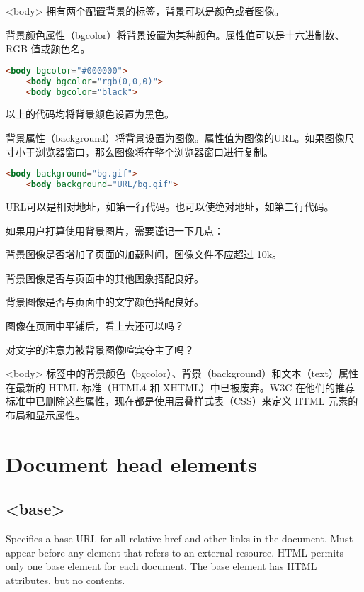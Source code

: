 <body> 拥有两个配置背景的标签，背景可以是颜色或者图像。

背景颜色属性（bgcolor）将背景设置为某种颜色。属性值可以是十六进制数、RGB 值或颜色名。

\begin{lstlisting}[language=HTML]
	<body bgcolor="#000000">
	<body bgcolor="rgb(0,0,0)">
	<body bgcolor="black">
\end{lstlisting}

以上的代码均将背景颜色设置为黑色。

背景属性（background）将背景设置为图像。属性值为图像的URL。如果图像尺寸小于浏览器窗口，那么图像将在整个浏览器窗口进行复制。

\begin{lstlisting}[language=HTML]
	<body background="bg.gif">
	<body background="URL/bg.gif">
\end{lstlisting}

URL可以是相对地址，如第一行代码。也可以使绝对地址，如第二行代码。

如果用户打算使用背景图片，需要谨记一下几点：
\begin{compactitem}
\item 背景图像是否增加了页面的加载时间，图像文件不应超过 10k。
\item 背景图像是否与页面中的其他图象搭配良好。
\item 背景图像是否与页面中的文字颜色搭配良好。
\item 图像在页面中平铺后，看上去还可以吗？
\item 对文字的注意力被背景图像喧宾夺主了吗？
\end{compactitem}

<body> 标签中的背景颜色（bgcolor）、背景（background）和文本（text）属性在最新的 HTML 标准（HTML4 和 XHTML）中已被废弃。W3C 在他们的推荐标准中已删除这些属性，现在都是使用层叠样式表（CSS）来定义 HTML 元素的布局和显示属性。

\chapter{Document head elements}



\section{<base>}



Specifies a base URL for all relative href and other links in the document. Must appear before any element that refers to an external resource. HTML permits only one base element for each document. The base element has HTML attributes, but no contents.


